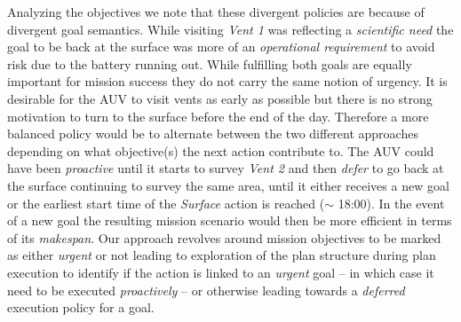 Analyzing the objectives we note that these divergent policies are
because of divergent goal semantics. While visiting {\em Vent 1} was
reflecting a \emph{scientific need} the goal to be back at the surface
was more of an \emph{operational requirement} to avoid risk due to the
battery running out. While fulfilling both goals are equally important
for mission success they do not carry the same notion of urgency. It
is desirable for the AUV to visit vents as early as possible but there is
no strong motivation to turn to the surface before the end of the
day. Therefore a more balanced policy would be to alternate between the
two different approaches depending on what objective(s) the next action
contribute to. The AUV could have been {\em proactive} until it starts
to survey {\em Vent 2} and then {\em defer} to go back at the surface
continuing to survey the same area, until it either receives a new
goal or the earliest start time of the \emph{Surface} action is
reached ($\sim$ 18:00). In the event of a new goal
the resulting mission scenario would then be more efficient in terms
of its \emph{makespan}. Our approach revolves around mission
objectives to be marked as either {\em urgent} or not leading to 
exploration of the plan structure during plan execution to identify if the action
is linked to an {\em urgent} goal -- in which case it need to be
executed {\em proactively} -- or otherwise leading towards 
a {\em deferred} execution policy for a goal.
 


